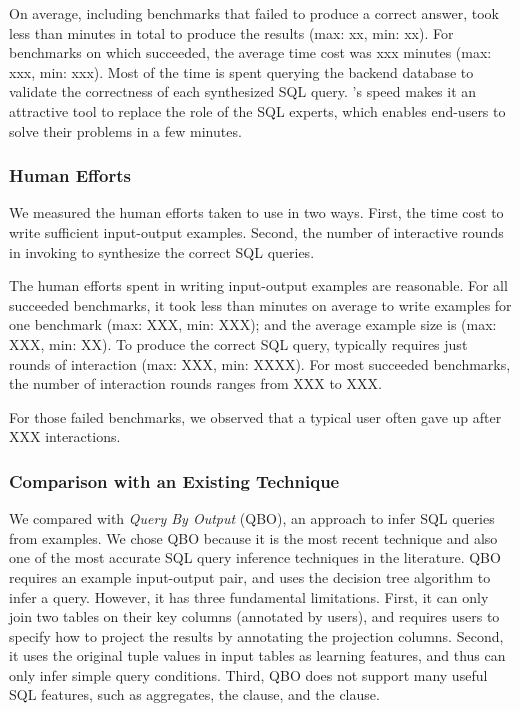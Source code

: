 On average,
including benchmarks that \ourtool failed to produce
a correct answer,
\ourtool took less than \avgtime minutes in total to
produce the results (max: xx, min: xx).
For benchmarks on which \ourtool succeeded, the average
time cost was xxx minutes (max: xxx, min: xxx).
Most of the time is spent querying the backend
database to validate the correctness of each synthesized  SQL query.
\ourtool's speed makes it an attractive tool to replace
the role of the SQL experts, which
enables end-users to solve their problems in a few
minutes.




\subsubsection{Human Efforts}
\label{sec:human}

We measured the human efforts taken to use \ourtool in two ways.
First, the time cost to write sufficient input-output examples. Second,
the number of interactive rounds in invoking \ourtool
to synthesize the correct SQL queries.

The human efforts spent in writing
input-output examples are reasonable. For
all succeeded benchmarks, it took less than
\avghum minutes on average to write examples
for one benchmark (max: XXX, min: XXX); and the
average example size is \avgtuple
(max: XXX, min: XX).
To produce the correct SQL query,
\ourtool typically requires just \avground rounds of
interaction (max: XXX, min: XXXX).
For most succeeded benchmarks, the number of interaction
rounds ranges from XXX to XXX.

For those failed benchmarks, we observed that
a typical user often gave up after XXX interactions.


\subsubsection{Comparison with an Existing Technique}
\label{sec:comparison}
We compared \ourtool with \textit{Query By Output} (QBO), an
approach to infer SQL queries~\cite{Tran:2009} from examples.
We chose QBO because it is the most recent technique and also one
of the most accurate SQL query inference techniques in
the literature. QBO requires an example input-output pair, and
uses the decision tree algorithm to infer a query.
However, it
has three fundamental limitations. First, 
it can only join two tables on their key columns (annotated by users), and requires
users to specify how to project the results
by annotating the projection columns.
Second, it uses the original tuple values
in input tables as learning features, and thus can only
infer simple query conditions. Third, QBO does not support
many useful SQL features, such as aggregates, the 
clause, and the  clause.

